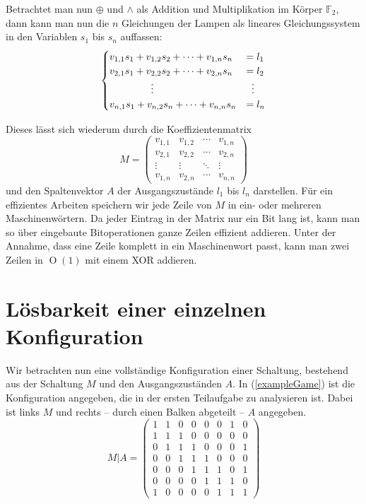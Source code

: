 \documentclass{scrartcl}
\newcommand{\ftwo}{\ensuremath{\mathbb F_2}}
\DeclareMathOperator{\bigO}{O}
\newcommand{\xor}{\oplus}
\begin{document}
Betrachtet man nun $\xor$ und $\land$ als Addition und Multiplikation im Körper
\ftwo, dann kann man nun die $n$ Gleichungen der Lampen als lineares
Gleichungssystem in den Variablen $s_1$ bis $s_n$ auffassen:
\begin{equation}
\begin{cases}
  v_{1,1}s_1+v_{1,2}s_2+\dots+v_{1,n}s_n&=l_1\\
  v_{2,1}s_1+v_{2,2}s_2+\dots+v_{2,n}s_n&=l_2\\
  \hfil\vdots\hfil&\hfil\vdots\hfil\\
  v_{n,1}s_1+v_{n,2}s_n+\dots+v_{n,n}s_n&=l_n\\
\end{cases}
\end{equation}

Dieses lässt sich wiederum durch die Koeffizientenmatrix
\begin{equation}
M=
\begin{pmatrix}
  v_{1,1}&v_{1,2}&\cdots&v_{1,n}\\
  v_{2,1}&v_{2,2}&\cdots&v_{2,n}\\
  \vdots &\vdots &\ddots&\vdots\\
  v_{1,n}&v_{2,n}&\cdots&v_{n,n}
\end{pmatrix}\label{Mdef}
\end{equation}
und den Spaltenvektor $A$ der Ausgangszustände $l_1$ bis $l_n$ darstellen. Für
ein effizientes Arbeiten speichern wir jede Zeile von $M$ in ein- oder mehreren
Maschinenwörtern. Da jeder Eintrag in der Matrix nur ein Bit lang ist, kann man
so über eingebaute Bitoperationen ganze Zeilen effizient addieren. Unter der
Annahme, dass eine Zeile komplett in ein Maschinenwort passt, kann man zwei
Zeilen in $\bigO(1)$ mit einem XOR addieren.

\section{Lösbarkeit einer einzelnen Konfiguration}
\label{singleConf}
Wir betrachten nun eine vollständige Konfiguration einer Schaltung, bestehend
aus der Schaltung $M$ und den Ausgangszuständen $A$. In (\ref{exampleGame}) ist
die Konfiguration angegeben, die in der ersten Teilaufgabe zu analysieren ist.
Dabei ist links $M$ und rechts -- durch einen Balken abgeteilt -- $A$ angegeben.
\begin{equation}
M\vert A=\left(
\begin{array}{ccccccc|c}
  1&1&0&0&0&0&1&0\\
  1&1&1&0&0&0&0&0\\
  0&1&1&1&0&0&0&1\\
  0&0&1&1&1&0&0&0\\
  0&0&0&1&1&1&0&1\\
  0&0&0&0&1&1&1&0\\
  1&0&0&0&0&1&1&1 
\end{array}\right)\label{exampleGame}
\end{equation}
\end{document}
